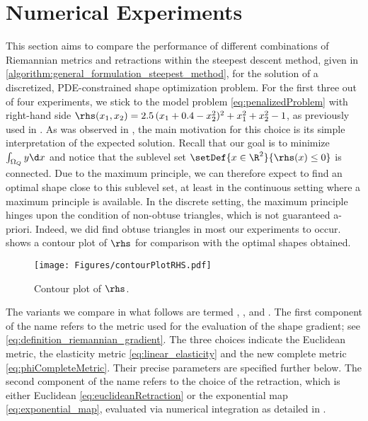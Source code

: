 \section{Numerical Experiments}
\label{section:numerical_results}

This section aims to compare the performance of different combinations of Riemannian metrics and retractions within the steepest descent method, given in \cref{algorithm:general_formulation_steepest_method}, for the solution of a discretized, PDE-constrained shape optimization problem.
For the first three out of four experiments, we stick to the model problem \eqref{eq:penalizedProblem} with right-hand side $\rhs(x_1,x_2) = 2.5 \, (x_1 + 0.4 - x_2^2)^2 + x_1^2 + x_2^2 - 1$, as previously used in \cite{EtlingHerzogLoayzaWachsmuth:2020:1}.
As was observed in \cite{BartelsWachsmuth:2020:1}, the main motivation for this choice is its simple interpretation of the expected solution.
Recall that our goal is to minimize $\int_{\Omega_Q} y \d x$ and notice that the  sublevel set $\setDef{x \in \R^2}{\rhs(x) \le 0}$ is connected.
Due to the maximum principle, we can therefore expect to find an optimal shape close to this sublevel set, at least in the continuous setting where a maximum principle is available.
In the discrete setting, the maximum principle hinges upon the condition of non-obtuse triangles, which is not guaranteed a-priori.
Indeed, we did find obtuse triangles in most our experiments to occur.
 shows a contour plot of $\rhs$ for comparison with the optimal shapes obtained.

\begin{figure}[htp]
	\centering
	\texttt{[image: Figures/contourPlotRHS.pdf]}
	\caption{Contour plot of $\rhs$.}
	\label{fig:contourPlotRHS}
\end{figure}

The variants we compare in what follows are termed \EucEuc, \ElasEuc, \CompEuc and \CompComp.
The first component of the name refers to the metric used for the evaluation of the shape gradient; see \eqref{eq:definition_riemannian_gradient}.
The three choices indicate the Euclidean metric, the elasticity metric \eqref{eq:linear_elasticity} and the new complete metric \eqref{eq:phiCompleteMetric}.
Their precise parameters are specified further below.
The second component of the name refers to the choice of the retraction, which is either Euclidean \eqref{eq:euclideanRetraction} or the exponential map \eqref{eq:exponential_map}, evaluated via numerical integration as detailed in \cite[Section~5]{HerzogLoayzaRomero:2022:1}.

